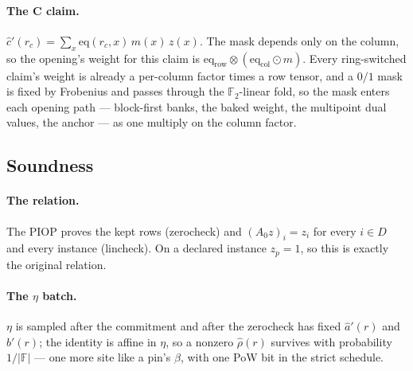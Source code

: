 \documentclass[11pt]{article}
\newcommand{\Ftwo}{\mathbb{F}_2}
\newcommand{\eq}{\mathrm{eq}}
\begin{document}
\paragraph{The C claim.} $\hat c'(r_c) = \sum_x \eq(r_c,x)\,m(x)\,z(x)$.
The mask depends only on the column, so the opening's weight for this
claim is $\eq_{\mathrm{row}}\otimes(\eq_{\mathrm{col}}\odot m)$. Every
ring-switched claim's weight is already a per-column factor times a row
tensor, and a $0/1$ mask is fixed by Frobenius and passes through the
$\Ftwo$-linear fold, so the mask enters each opening path --- block-first
banks, the baked weight, the multipoint dual values, the anchor --- as one
multiply on the column factor.

\subsection{Soundness}\label{sec:degreeone-sound}

\paragraph{The relation.} The PIOP proves the kept rows (zerocheck) and
$(A_0z)_i = z_i$ for every $i\in D$ and every instance (lincheck). On a
declared instance $z_p = 1$, so this is exactly the original relation.

\paragraph{The $\eta$ batch.} $\eta$ is sampled after the commitment and
after the zerocheck has fixed $\hat a'(r)$ and $\hat b'(r)$; the identity
is affine in $\eta$, so a nonzero $\hat\rho(r)$ survives with probability
$1/|\mathbb{F}|$ --- one more site like a pin's $\beta$, with one PoW bit in
the strict schedule.
\end{document}
